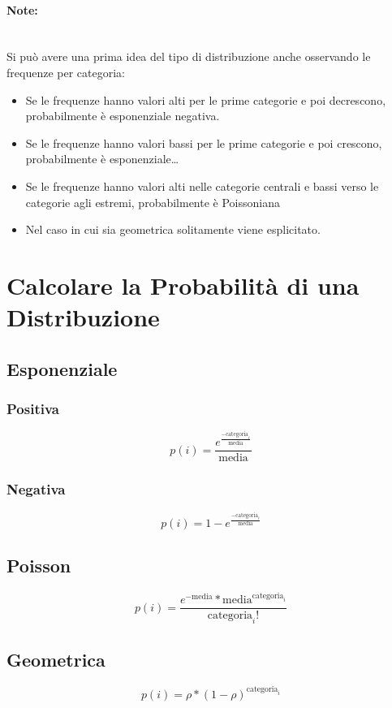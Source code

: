 \paragraph{Note:}\ \\
Si può avere una prima idea del tipo di distribuzione anche
osservando le frequenze per categoria:
\begin{itemize}
      \item Se le frequenze hanno valori alti per le prime categorie e poi
            decrescono, probabilmente è esponenziale negativa.
      \item Se le frequenze hanno valori bassi per le prime categorie e poi
            crescono, probabilmente è esponenziale\dots
      \item Se le frequenze hanno valori alti nelle categorie centrali e bassi
            verso le categorie agli estremi, probabilmente è Poissoniana
      \item Nel caso in cui sia geometrica solitamente viene esplicitato.
\end{itemize}

\section{Calcolare la Probabilità di una Distribuzione} \label{pi}

\subsection{Esponenziale}

\subsubsection{Positiva}

\[
      p(i) = \frac{e^{\frac{- \text{categoria}_i}{\text{media}}}}{\text{media}}
\]

\subsubsection{Negativa}

\[
      p(i) = 1 - e^{\frac{- \text{categoria}_i}{\text{media}}}
\]

\subsection{Poisson}

\[
      p(i) = \frac{e^{- \text{media}} * \text{media}^{\text{categoria}_i}}{\text{categoria}_i !}
\]

\subsection{Geometrica}

\[
      p(i) = \rho * (1 - \rho)^{\text{categoria}_i}
\]
